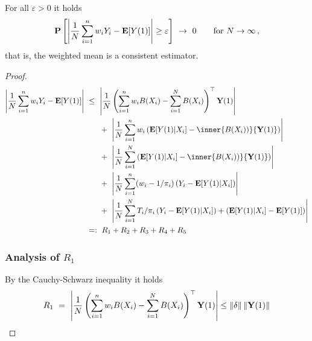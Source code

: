 \begin{theorem}
  \label{bw:ce:th}
  For all
  $\varepsilon>0$ it holds
  \begin{gather}
    \P
    \left[ 
  \left| 
    \frac{1}{N}
    \sum_{i=1}^{n} 
    w_i
    Y_i
    -
    \E[Y(1)]
  \right|
    \ge
    \varepsilon
    \right]
    \ 
    \to
    \ 
    0
    \qquad
    \text{for}\ 
    N
    \to 
    \infty
    \,,
  \end{gather}
  that is, the weighted mean is a consistent estimator.
\end{theorem}

\begin{proof}
\begin{align*}
  \left| 
    \frac{1}{N}
    \sum_{i=1}^{n} 
    w_i
    Y_i
    -
    \E[Y(1)]
  \right|
  &
  \ 
  \le
  \ 
  \left|  
  \frac{1}{N}
  \left( 
    \sum_{i=1}^{n} 
    w_i
    B(X_i)
    -
    \sum_{i=1}^{N} 
    B(X_i)
  \right)
  ^\top
     \mathbf{Y}(1) 
  \right|
  \\
  &
  \qquad
  +
  \ 
  \left|  
  \frac{1}{N}
    \sum_{i=1}^{n} 
    w_i
    \left( 
    \E[Y(1)| X_i]
    -
    \inner
    {B(X_i))}
    { \mathbf{Y}(1) }
    \right)
  \right|
  \\
  &
  \qquad
  +
  \ 
  \left|  
  \frac{1}{N}
    \sum_{i=1}^{N} 
    \left( 
    \E[Y(1)| X_i]
    -
    \inner
    {B(X_i))}
    { \mathbf{Y}(1) }
    \right)
  \right|
  \\
  &
  \qquad
  +
  \ 
  \left|  
  \frac{1}{N}
    \sum_{i=1}^{n} 
    (
    w_i 
    -
    1/\pi_i
    )
    \left( 
      Y_i
    -
    \E[Y(1)| X_i]
    \right)
  \right|
  \\
  &
  \qquad
  +
  \ 
  \left|  
  \frac{1}{N}
    \sum_{i=1}^{N} 
    T_i
    /\pi_i
    \left( 
      Y_i
    -
    \E[Y(1)| X_i]
    \right)
    +
    \left( 
    \E[Y(1)| X_i]
    -
    \E[Y(1)]
    \right)
  \right|
  \\
  &
  \ 
  =:
  \ 
  R_1
  +
  R_2
  +
  R_3
  +
  R_4
  +
  R_5
  \end{align*}
  \subsubsection*{Analysis of $R_1$}
  By the Cauchy-Schwarz inequality it holds
  \begin{gather}
    R_1
    \ 
    =
    \ 
   \left|  
  \frac{1}{N}
  \left( 
    \sum_{i=1}^{n} 
    w_i
    B(X_i)
    -
    \sum_{i=1}^{N} 
    B(X_i)
  \right)
  ^\top
     \mathbf{Y}(1) 
  \right|
  \le
  \norm{\delta}
  \norm{
     \mathbf{Y}(1) 
  }
  \end{gather}


\end{proof}
